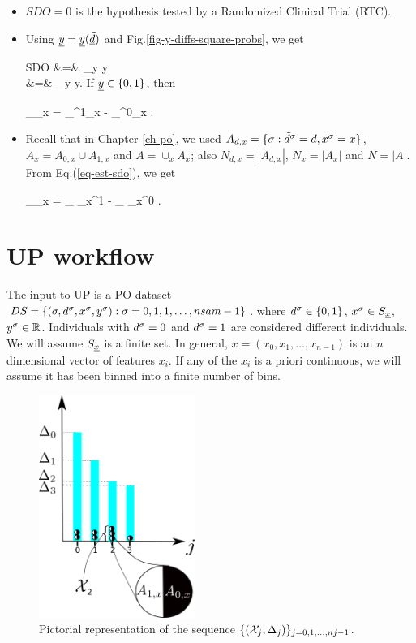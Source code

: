 \begin{itemize}
\item
$SDO=0$ is the hypothesis tested 
by a Randomized Clinical Trial (RTC). 

\item
Using ${\underline{y}}={\underline{y}}({\underline{\tilde{d}}})$
and Fig.\ref{fig-y-diffs-square-probs},
we get

\beqa
SDO &=& \sum_y y
\\
&=&
\sum_y y
\;.
\eeqa
If ${\underline{y}}\in \{0,1\}$, then

\beq
{}_{\displaystyle \delta_x}
=
_{\displaystyle \pi^1_x}
-
_{\displaystyle \pi^0_x}
\;.
\eeq

\item
Recall that in
Chapter \ref{ch-po}, we used 
$A_{d, x}=\{\sigma:{\tilde{d}}^\sigma=d,x^\sigma=x\}$,
$A_x=A_{0,x}\cup A_{1,x}$ and $A=\cup_x A_x$; also
$N_{d,x}=|A_{d,x}|$, $N_x=|A_x|$ and $N=|A|$.
From
Eq.(\ref{eq-est-sdo}),
we get


\beq
{}_{\displaystyle\delta_x}
=
_
{\displaystyle \pi_x^1}
-
_
{\displaystyle \pi_x^0}
\;.
\label{eq-est-sdo-uplift}
\eeq

\end{itemize}


\section{UP workflow}

The input
to UP is a PO
dataset $DS= \{ (\sigma, d^\sigma, x^\sigma, y^\sigma):
 \sigma=0,1, 1, \ldots, nsam-1\}$.
where $d^\sigma\in \{0,1\}$, $x^\sigma \in S_{\underline{x}}$,
$y^\sigma\in { \mathbb{R}}$.
 Individuals
with $d^\sigma=0$ and $d^\sigma=1$
are considered 
different individuals.
We will assume 
$S_{\underline{x}}$ is a finite set.
In general,
$x=(x_0, x_1,\dots, x_{n-1})$ is an $n$ dimensional 
vector of features $x_i$.
If any of the $x_i$
is a priori continuous, we will
assume it has  been binned into
a finite number of bins.

\begin{figure}[h!]
\centering
\includegraphics[width=2in]
{uplift/uplift-bins.png}
\caption{
Pictorial
representation
of the sequence
$\{({\cal X}_j, \Delta_j)\}_{j=0,1, \ldots, nj-1}$.
}
\label{fig-uplift-bins}
\end{figure}


